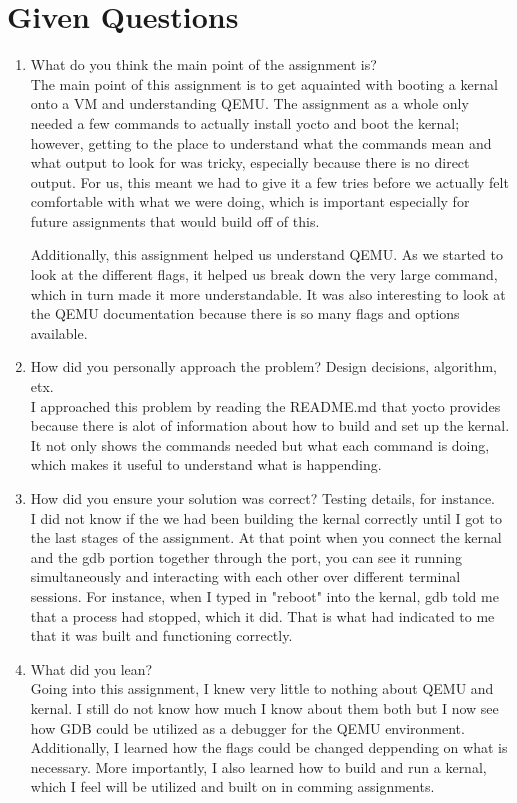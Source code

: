 \documentclass[10pt,draftclsnofoot]{article}
\begin{document}
\section{Given Questions}
\begin{enumerate}
\item{What do you think the main point of the assignment is?} \\
The main point of this assignment is to get aquainted with booting a kernal onto a VM
and understanding QEMU. The assignment as a whole only needed a few commands to 
actually install yocto and boot the kernal; however, getting to the place to 
understand what the commands mean and what output to look for was tricky, especially 
because there is no direct output. For us, this meant we had to give it a few tries 
before we actually felt comfortable with what we were doing, which is important 
especially for future assignments that would build off of this. \par
Additionally, this assignment helped us understand QEMU. As we started to look at the 
different flags, it helped us break down the very large command, which in turn made 
it more understandable. It was also interesting to look at the QEMU documentation 
because there is so many flags and options available. \par
\item{How did you personally approach the problem? Design decisions, algorithm, etx.} \\
I approached this problem by reading the README.md that yocto provides because there is alot of information about how to build and set up the kernal. It not only shows the 
commands needed but what each command is doing, which makes it useful to understand 
what is happending. \par
\item{How did you ensure your solution was correct? Testing details, for instance.} \\
I did not know if the we had been building the kernal correctly until I got to the last
stages of the assignment. At that point when you connect the kernal and the gdb portion 
together through the port, you can see it running simultaneously and interacting with 
each other over different terminal sessions. For instance, when I typed in "reboot" 
into the kernal, gdb told me that a process had stopped, which it did. That is what 
had indicated to me that it was built and functioning correctly. \par
\item{What did you lean?} \\
Going into this assignment, I knew very little to nothing about QEMU and kernal. I 
still do not know how much I know about them both but I now see how GDB could be 
utilized as a debugger for the QEMU environment. Additionally, I learned how the 
flags could be changed deppending on what is necessary. More importantly, I also
learned how to build and run a kernal, which I feel will be utilized and built on in 
comming assignments. \par
\end{enumerate}
\end{document}
